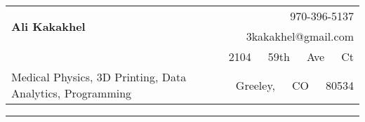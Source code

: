 \documentclass[10pt]{article}
\begin{document}
%
%
\hspace{-.8cm}
\begin{tabular}{lr}
\multirow{2}{15.2cm}{\Huge\bfseries Ali Kakakhel}               & 970-396-5137                    \\
                                                                & 3kakakhel@gmail.com             \\
                                                                & 2104\ \ \ 59th\ \ \ Ave\ \ \ Ct \\
Medical Physics, 3D Printing, Data Analytics, Programming       & Greeley,\ \ \ CO\ \ \ 80534     \\
\end{tabular}
\rule{196mm}{0.5pt}

%
%
\end{document}
